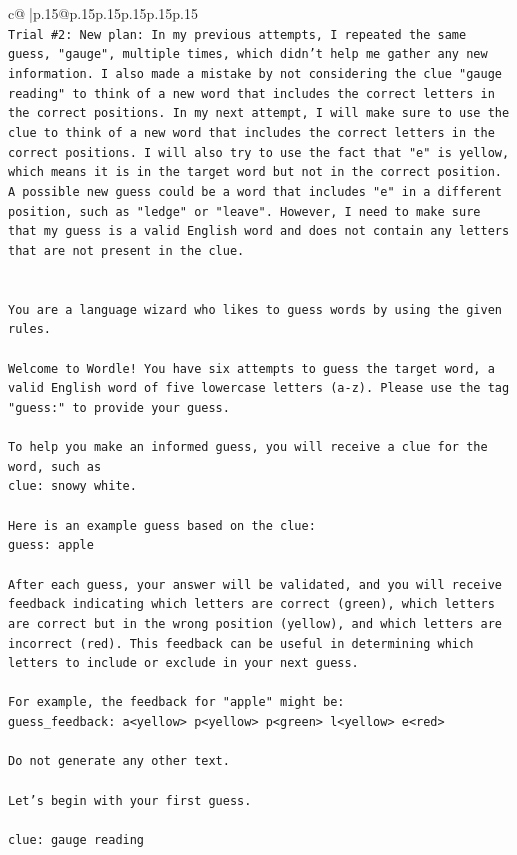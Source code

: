 \documentclass{article}
\begin{document}
{\begin{supertabular}{c@{$\;$}|p{.15\linewidth}@{}p{.15\linewidth}p{.15\linewidth}p{.15\linewidth}p{.15\linewidth}p{.15\linewidth}}
{{{\\ 
\texttt{Trial \#2: New plan: In my previous attempts, I repeated the same guess, "gauge", multiple times, which didn't help me gather any new information. I also made a mistake by not considering the clue "gauge reading" to think of a new word that includes the correct letters in the correct positions. In my next attempt, I will make sure to use the clue to think of a new word that includes the correct letters in the correct positions. I will also try to use the fact that "e" is yellow, which means it is in the target word but not in the correct position. A possible new guess could be a word that includes "e" in a different position, such as "ledge" or "leave". However, I need to make sure that my guess is a valid English word and does not contain any letters that are not present in the clue.} \\
\\ 
\\ 
\texttt{You are a language wizard who likes to guess words by using the given rules.} \\
\\ 
\texttt{Welcome to Wordle! You have six attempts to guess the target word, a valid English word of five lowercase letters (a{-}z). Please use the tag "guess:" to provide your guess.} \\
\\ 
\texttt{To help you make an informed guess, you will receive a clue for the word, such as} \\
\texttt{clue: snowy white.} \\
\\ 
\texttt{Here is an example guess based on the clue: } \\
\texttt{guess: apple} \\
\\ 
\texttt{After each guess, your answer will be validated, and you will receive feedback indicating which letters are correct (green), which letters are correct but in the wrong position (yellow), and which letters are incorrect (red). This feedback can be useful in determining which letters to include or exclude in your next guess.} \\
\\ 
\texttt{For example, the feedback for "apple" might be:} \\
\texttt{guess\_feedback: a<yellow> p<yellow> p<green> l<yellow> e<red>} \\
\\ 
\texttt{Do not generate any other text.} \\
\\ 
\texttt{Let's begin with your first guess.} \\
\\ 
\texttt{clue: gauge reading} \\
            }
        }
    }
     \\ \\


\end{supertabular}}
\end{document}
